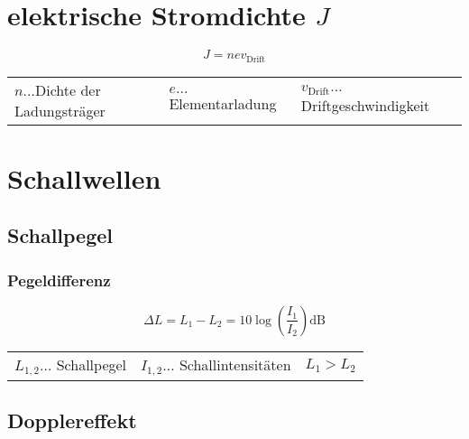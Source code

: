 	\section{elektrische Stromdichte $J$}
		\[ J = n e v_{\mathrm{Drift}} \]
		
		\begin{table}[h]
		\begin{tabular}{lll}
		$n\dots$Dichte der Ladungsträger & $e\dots$Elementarladung & $v_{\mathrm{Drift}}\dots$ Driftgeschwindigkeit\\
		\end{tabular}
		\end{table}
	
	\section{Schallwellen}
		\subsection{Schallpegel}
			\subsubsection{Pegeldifferenz}
				\[
					\Delta L=L_1-L_2=10\log\left(\frac{I_1}{I_2}\right)\mathrm{dB}
				\]

				\begin{table}[h]
				\begin{tabular}{lll}
				$L_{1,2}\dots$ Schallpegel & $I_{1,2}\dots$ Schallintensitäten & $L_1>L_2$\\
				\end{tabular}
				\end{table}

\clearpage

		\subsection{Dopplereffekt}

